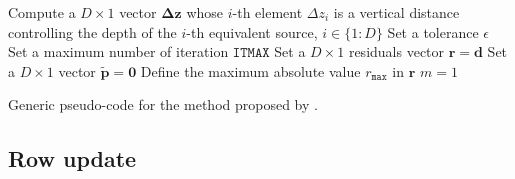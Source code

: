 \begin{algorithm}
	\Input{}
	Compute a $D \times 1$ vector $\boldsymbol{\Delta}\mathbf{z}$ whose $i$-th element $\Delta z_{i}$ 
	is a vertical distance controlling the depth of the $i$-th equivalent source, $i \in \{1:D\}$ \;
	Set a tolerance $\epsilon$ \;
	Set a maximum number of iteration $\mathtt{ITMAX}$ \;
	Set a $D \times 1$ residuals vector $\mathbf{r} = \mathbf{d}$ \;
	Set a $D \times 1$ vector $\tilde{\mathbf{p}} = \mathbf{0}$ \;
	Define the maximum absolute value $r_{\mathtt{max}}$ in $\mathbf{r}$ \;
	$m = 1$ \;
	\caption{Generic pseudo-code for the method proposed by \cite{cordell1992}.}
	\label{alg:C92}
\end{algorithm}



\subsection{Row update}

